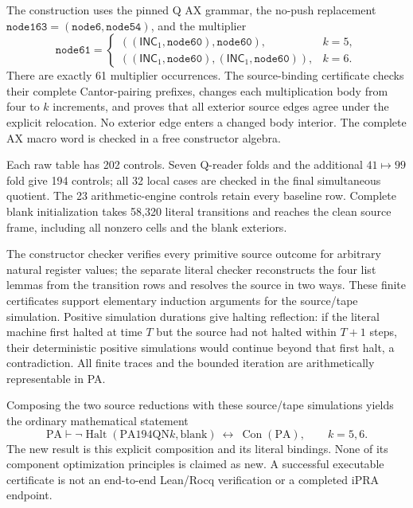 The construction uses the pinned Q AX grammar, the no-push replacement
$\texttt{node163}=(\texttt{node6},\texttt{node54})$, and the multiplier
\[
 \texttt{node61}=
 \begin{cases}
 ((\mathsf{INC}_1,\texttt{node60}),\texttt{node60}),&k=5,\\
 ((\mathsf{INC}_1,\texttt{node60}),(\mathsf{INC}_1,\texttt{node60})),&k=6.
 \end{cases}
\]
There are exactly 61 multiplier occurrences. The source-binding certificate
checks their complete Cantor-pairing prefixes, changes each multiplication body
from four to $k$ increments, and proves that all exterior source edges agree
under the explicit relocation. No exterior edge enters a changed body interior.
The complete AX macro word is checked in a free constructor algebra.

Each raw table has 202 controls. Seven Q-reader folds and the additional
$41\mapsto99$ fold give 194 controls; all 32 local cases are checked in the final
simultaneous quotient. The 23 arithmetic-engine controls retain every baseline
row. Complete blank initialization takes 58,320 literal transitions and reaches
the clean source frame, including all nonzero cells and the blank exteriors.

The constructor checker verifies every primitive source outcome for arbitrary
natural register values; the separate literal checker reconstructs the four
list lemmas from the transition rows and resolves the source in two ways.
These finite certificates support elementary induction arguments for the
source/tape simulation. Positive simulation durations give halting reflection:
if the literal machine first halted at time $T$ but the source had not halted
within $T+1$ steps, their deterministic positive simulations would continue
beyond that first halt, a contradiction. All finite traces and the bounded
iteration are arithmetically representable in PA.

Composing the two source reductions with these source/tape simulations yields
the ordinary mathematical statement
\[
 \mathrm{PA}\vdash
   \neg\operatorname{Halt}(\mathrm{PA194QN}k,\mathrm{blank})
       \ \longleftrightarrow\ \operatorname{Con}(\mathrm{PA}),
 \qquad k=5,6.
\]
The new result is this explicit composition and its literal bindings. None of
its component optimization principles is claimed as new. A successful executable
certificate is not an end-to-end Lean/Rocq verification or a completed iPRA endpoint.
